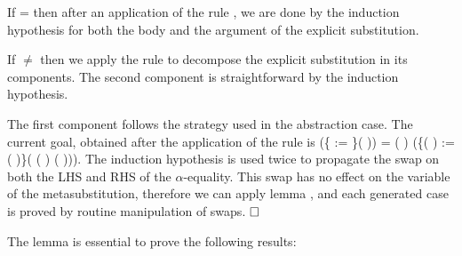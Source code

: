 \begin{coqdoccode}
\end{coqdoccode}
If  =     then after an application of the rule , we are done by the induction hypothesis for both the body and the argument of the explicit substitution.
\begin{coqdoccode}
\end{coqdoccode}
If  \ensuremath{\not=}     then we apply the rule  to decompose the explicit substitution in its components. The second component is straightforward  by the induction hypothesis.
\begin{coqdoccode}
\end{coqdoccode}
The first component follows the strategy used in the abstraction case. The current goal, obtained after the application of the rule  is    (\{ := \}(   )) =
    (   ) (\{(   ) := (   )\}( (   )  (   ))). The induction hypothesis is used twice to propagate the swap on both the LHS and RHS of the $\alpha$-equality. This swap has no effect on the variable  of the metasubstitution, therefore we can apply lemma , and each generated case is proved by routine manipulation of swaps. $\hfill\Box$
\begin{coqdoccode}
\coqdocemptyline
\end{coqdoccode}
The lemma  is essential to prove the following results: 

